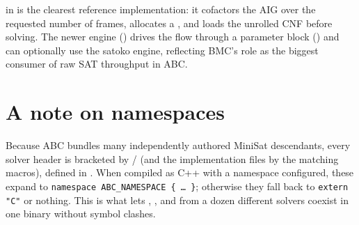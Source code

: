  in  is the clearest reference
implementation: it cofactors the AIG over the requested number of frames,
allocates a , and loads the unrolled CNF before solving. The newer
 engine () drives the flow through a parameter
block () and can optionally use the satoko engine, reflecting
BMC's role as the biggest consumer of raw SAT throughput in ABC.

\section{A note on namespaces}

Because ABC bundles many independently authored MiniSat descendants, every solver
header is bracketed by  /
 (and the implementation files by the matching
 macros), defined in . When compiled
as C++ with a namespace configured, these expand to
\texttt{namespace ABC\_NAMESPACE \{~\dots~\}}; otherwise they fall back to
\texttt{extern "C"} or nothing. This is what lets , , and
 from a dozen different solvers coexist in one binary without symbol
clashes.
